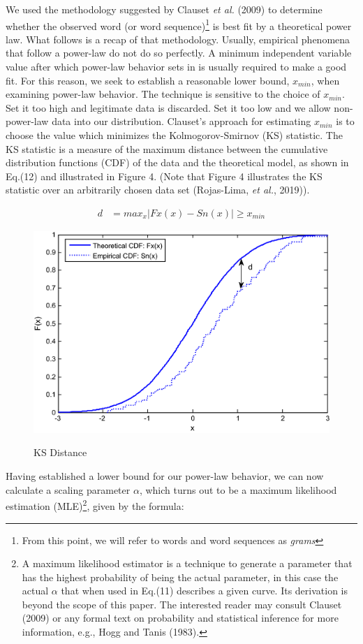 \documentclass[12pt]{article}
\begin{document}
We used the methodology suggested by Clauset \emph{et al.} (2009) to determine whether the observed word (or word sequence)\footnote[7]{From this point, we will refer to words and word sequences as \emph{grams}} is best fit by a theoretical power law. What follows is a recap of that methodology. Usually, empirical phenomena that follow a power-law do not do so perfectly. A minimum independent variable value after which power-law behavior sets in is usually required to make a good fit. For this reason, we seek to establish a reasonable lower bound, $x_{min}$, when examining power-law behavior.  The technique is sensitive to the choice of $x_{min}$.  Set it too high and legitimate data is discarded.  Set it too low and we allow non-power-law data into our distribution. Clauset's approach for estimating $x_{min}$ is to choose the value which minimizes the Kolmogorov-Smirnov (KS) statistic. The KS statistic is a measure of the maximum distance between the cumulative distribution functions (CDF) of the data and the theoretical model, as shown in Eq.(12) and illustrated in Figure 4. (Note that Figure 4 illustrates the KS statistic over an arbitrarily chosen data set (Rojas-Lima, \emph{et al.}, 2019)).

\begin{align}
d &= max_x|Fx(x)-Sn(x)|\geq x_{min}
\end{align}


\begin{figure}[h!]
\centering
  \includegraphics[scale=.75]{ks_test.png}\\
  \caption{KS Distance}
\end{figure}

Having established a lower bound for our power-law behavior, we can now calculate a scaling parameter $\alpha$, which turns out to be a  maximum likelihood estimation (MLE)\footnote[8]{A maximum likelihood estimator is a technique to generate a parameter that has the highest probability of being the actual parameter, in this case the actual $\alpha$ that when used in Eq.(11) describes a given curve.  Its derivation is beyond the scope of this paper.  The interested reader may consult Clauset (2009) or any formal text on probability and statistical inference for more information, e.g., Hogg and Tanis (1983).}, given by the formula:
\end{document}
